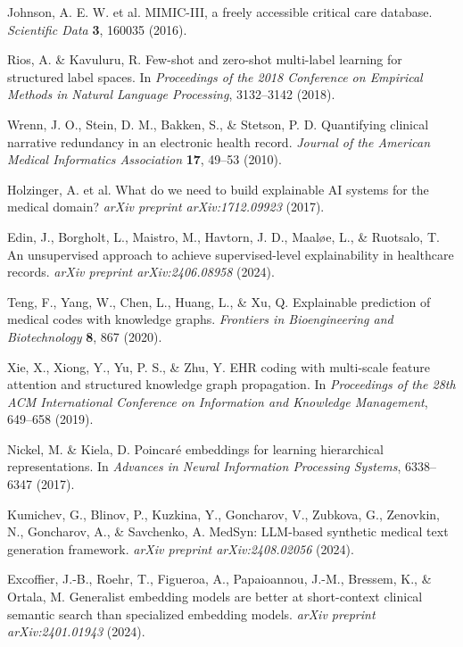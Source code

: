 \documentclass[12pt,a4paper]{report}
\begin{document}
\begin{thebibliography}{99}
Johnson, A. E. W. et al. MIMIC-III, a freely accessible critical care database. \textit{Scientific Data} \textbf{3}, 160035 (2016).

Rios, A. \& Kavuluru, R. Few-shot and zero-shot multi-label learning for structured label spaces. In \textit{Proceedings of the 2018 Conference on Empirical Methods in Natural Language Processing}, 3132–3142 (2018).

Wrenn, J. O., Stein, D. M., Bakken, S., \& Stetson, P. D. Quantifying clinical narrative redundancy in an electronic health record. \textit{Journal of the American Medical Informatics Association} \textbf{17}, 49–53 (2010).

Holzinger, A. et al. What do we need to build explainable AI systems for the medical domain? \textit{arXiv preprint arXiv:1712.09923} (2017).

Edin, J., Borgholt, L., Maistro, M., Havtorn, J. D., Maaløe, L., \& Ruotsalo, T. An unsupervised approach to achieve supervised-level explainability in healthcare records. \textit{arXiv preprint arXiv:2406.08958} (2024).

Teng, F., Yang, W., Chen, L., Huang, L., \& Xu, Q. Explainable prediction of medical codes with knowledge graphs. \textit{Frontiers in Bioengineering and Biotechnology} \textbf{8}, 867 (2020).

Xie, X., Xiong, Y., Yu, P. S., \& Zhu, Y. EHR coding with multi-scale feature attention and structured knowledge graph propagation. In \textit{Proceedings of the 28th ACM International Conference on Information and Knowledge Management}, 649–658 (2019).

Nickel, M. \& Kiela, D. Poincaré embeddings for learning hierarchical representations. In \textit{Advances in Neural Information Processing Systems}, 6338–6347 (2017).

Kumichev, G., Blinov, P., Kuzkina, Y., Goncharov, V., Zubkova, G., Zenovkin, N., Goncharov, A., \& Savchenko, A. MedSyn: LLM-based synthetic medical text generation framework. \textit{arXiv preprint arXiv:2408.02056} (2024).

Excoffier, J.-B., Roehr, T., Figueroa, A., Papaioannou, J.-M., Bressem, K., \& Ortala, M. Generalist embedding models are better at short-context clinical semantic search than specialized embedding models. \textit{arXiv preprint arXiv:2401.01943} (2024).


\end{thebibliography}
\end{document}
